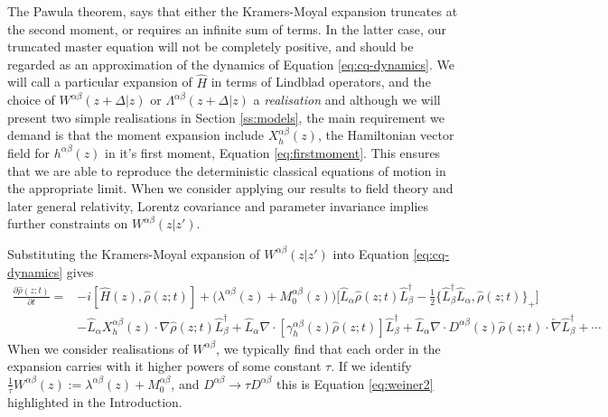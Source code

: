 \documentclass[aps,pra,showpacs,citeautoscript,amsmath,amssymb,floatfix,superscriptaddress,bbm, verbatim,amsfonts,changes,10pt,nofootinbib,longbibliography]{revtex4-1}
\def\X{\Lambda}
\def\z{{z}}
\def\L{{\hat{L}}}
\def\Hq{\hat{H}}
\def\dist{{\Delta}}
\def\rate{{W}}
\def\linrate{{\lambda}}
\def\ab{^{\alpha\beta}}
\newcommand{\M}[1]{M_{#1}\ab}
\renewcommand{\varrho}{\hat{\rho}}
\def\psiz{{\varrho(\z;t)}}
\def\friction{\gamma}
\begin{document}
The Pawula theorem\cite{pawula1967rf}, says that either the Kramers-Moyal expansion truncates at the second moment, or requires an infinite sum of terms.  In the latter case, our truncated master equation will not be completely positive, and should be regarded as an approximation of the dynamics of Equation \eqref{eq:cq-dynamics}.
We will call a particular expansion of $\Hq$ in terms of Lindblad operators, and the choice of $\rate^{\alpha\beta}(\z+\dist|\z)$ or $\X^{\alpha\beta}(\z+\dist|\z)$ a {\it realisation} 
and although we will present two simple realisations in Section \ref{ss:models},
the main requirement we demand is that the moment expansion include $X^{\alpha\beta}_h(\z)$, the Hamiltonian vector field for $h^{\alpha\beta}(\z)$ in it's first moment, Equation \eqref{eq:firstmoment}. This ensures that we are able to reproduce the deterministic classical equations of motion in the appropriate limit. When we consider applying our results to field theory and later general relativity,  Lorentz covariance and parameter invariance implies further constraints on $\rate\ab(\z|\z')$. 

Substituting the Kramers-Moyal expansion of $\rate^{\alpha\beta}(\z|\z')$ into Equation \eqref{eq:cq-dynamics}
gives 
\begin{align}
  \frac{\partial\psiz}{\partial t}=
  &-i[\Hq(\z),\psiz]
 + 
 \big(\linrate\ab(\z) +
  \M{0}(\z)\big)\Big[\L_{\alpha}\psiz\L_{\beta}^\dagger
  -\frac{1}{2}
\{\L_{\beta}^\dagger\L_{\alpha},\psiz\}_+   
\Big]
\nonumber\\
&-
\L_{\alpha}X^{\alpha\beta}_h(\z)\cdot\nabla \psiz\L_{\beta}^\dagger
+ 
\L_{\alpha}\nabla \cdot[\friction\ab_h(\z)\psiz]\L_{\beta}^\dagger
+
\L_{\alpha}
\nabla\cdot D^{\alpha\beta}(\z)\psiz\cdot\overleftarrow{\nabla}\L_{\beta}^\dagger
  +\cdots
  \nonumber
\end{align}
When we consider realisations of $\rate\ab$, we typically find that each order in the expansion carries with it higher powers of some constant $\tau$. If we identify
$\frac{1}{\tau}\rate\ab(\z):=\linrate\ab(\z)+\M{0}$, and $D\ab\rightarrow \tau D\ab$ this is Equation \eqref{eq:weiner2} highlighted in the Introduction.
\end{document}
